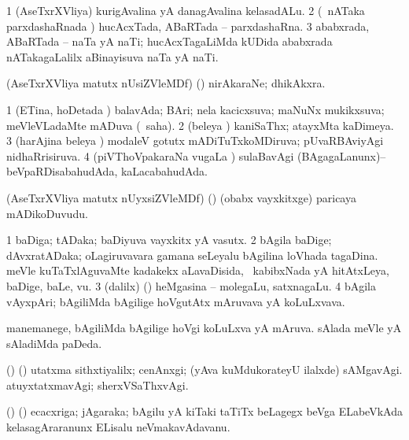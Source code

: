 \bentry
{}
\gl{\nA}
\bmng
\bnum
\num{1} (AseTxrXVliya) kurigAvalina yA danagAvalina kelasadALu. 
\num{2} (\sA\ nATaka parxdashaRnada \vi) hucAcxTada, ABaRTada -- parxdashaRna. 
\num{3} ababxrada, ABaRTada -- naTa yA naTi; hucAcxTagaLiMda kUDida ababxrada nATakagaLalilx aBinayisuva naTa yA naTi. 
\enum
\emng
\eentry

\bentry
{}
\gl{\nA}
\bmng
(AseTxrXVliya matutx nUsiZVleMDf) (\AmA) nirAkaraNe; dhikAkxra. 
\emng
\eentry

\bentry
{}
\gl{\gu}
\bmng
\bnum
\num{1} (ETina, hoDetada \vi) balavAda; BAri; nela kacicxsuva; maNuNx mukikxsuva; meVleVLadaMte mADuva (\rUpa\ saha). 
\num{2} (beleya \vi) kaniSaThx; atayxMta kaDimeya. 
\num{3} (harAjina beleya \vi) modaleV gotutx mADiTuTxkoMDiruva; pUvaRBAviyAgi nidhaRrisiruva. 
\num{4} (piVThoVpakaraNa \mo vugaLa \vi) sulaBavAgi (BAgagaLanunx)--beVpaRDisabahudAda, kaLacabahudAda. 
\enum
\emng
\eentry

\bentry
{}
\gl{\nA}
\bmng
(AseTxrXVliya matutx nUyxsiZVleMDf) (\ashi) (obabx vayxkitxge) paricaya mADikoDuvudu. 
\emng
\eentry

\bentry
{}
\gl{\nA}
\bmng
\bnum
\num{1} baDiga; tADaka; baDiyuva vayxkitx yA vasutx. 
\num{2} bAgila baDige; dAvxratADaka; oLagiruvavara gamana seLeyalu bAgilina loVhada tagaDina. meVle kuTaTxlAguvaMte kadakekx aLavaDisida, \sA\ kabibxNada yA hitAtxLeya, baDige, baLe, \mo vu.   
\num{3} (\bava dalilx) (\ashi) heMgasina -- molegaLu, satxnagaLu. 
\num{4} bAgila vAyxpAri; bAgiliMda bAgilige hoVgutAtx mAruvava yA koLuLxvava. 
\enum
\emng

\noindent
\gl{\nuga}
\bmng
\bnum
{}  
\banum
{} manemanege, bAgiliMda bAgilige hoVgi koLuLxva yA mAruva. 
 sAlada meVle yA sAladiMda paDeda. 
\eanum
\numie
{}  (\birx) (\ashi) 
\banum
{} utatxma sithxtiyalilx; cenAnxgi; (yAva kuMdukorateyU ilalxde) sAMgavAgi. 
 atuyxtatxmavAgi; sherxVSaThxvAgi. 
\eanum
\numie
\enum
\emng
\eentry

\bentry
{}
\gl{\nA}
\bmng
(\birx) (\ca) ecacxriga; jAgaraka; bAgilu yA kiTaki taTiTx beLagegx beVga ELabeVkAda kelasagAraranunx ELisalu neVmakavAdavanu. 
\emng
\eentry

